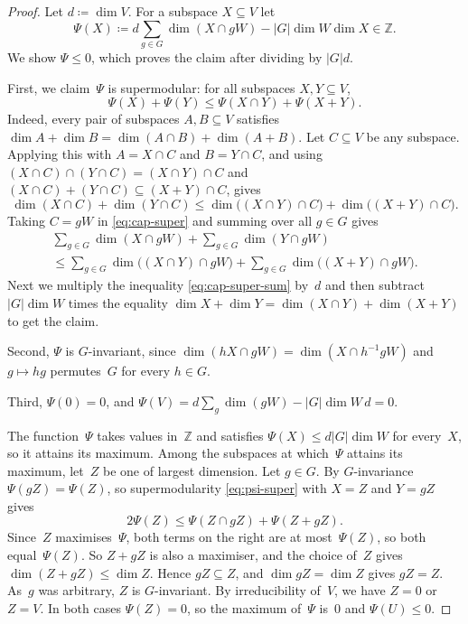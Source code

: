 \documentclass[11pt,letterpaper]{article}
\newcommand{\ZZ}{\mathbb{Z}}
\begin{document}
\begin{proof}
Let $d \coloneqq \dim V$. For a subspace $X \subseteq V$ let
\[
\Psi(X) \coloneqq d \sum_{g \in G} \dim(X \cap gW) - |G| \dim W \dim X \in \ZZ.
\]
We show $\Psi \leq 0$, which proves the claim after dividing by $|G| d$. 

First, we claim~$\Psi$ is supermodular: for all subspaces $X, Y \subseteq V$,
\begin{equation}\label{eq:psi-super}
\Psi(X) + \Psi(Y) \leq \Psi(X \cap Y) + \Psi(X + Y).
\end{equation}
Indeed, every pair of subspaces $A, B \subseteq V$ satisfies $\dim A + \dim B = \dim(A \cap B) + \dim(A+B)$. Let $C \subseteq V$ be any subspace. Applying this with $A = X \cap C$ and $B = Y \cap C$, and using $(X \cap C) \cap (Y \cap C) = (X \cap Y) \cap C$ and $(X \cap C) + (Y \cap C) \subseteq (X+Y) \cap C$, gives
\begin{equation}\label{eq:cap-super}
\dim(X \cap C) + \dim(Y \cap C) \leq \dim\bigl((X \cap Y) \cap C\bigr) + \dim\bigl((X+Y) \cap C\bigr).
\end{equation}
Taking $C = gW$ in \eqref{eq:cap-super} and summing over all $g \in G$ gives
\begin{multline}\label{eq:cap-super-sum}
\sum_{g \in G} \dim(X \cap gW) + \sum_{g \in G} \dim(Y \cap gW)\\[-0.5em]
\leq \sum_{g \in G} \dim\bigl((X \cap Y) \cap gW\bigr) + \sum_{g \in G} \dim\bigl((X+Y) \cap gW\bigr).
\end{multline}
Next we multiply the inequality \eqref{eq:cap-super-sum} by~$d$ and then subtract $|G| \dim W$ times the equality $\dim X + \dim Y = \dim(X \cap Y) + \dim(X+Y)$ to get the claim. 

Second, $\Psi$ is $G$-invariant, since $\dim(hX \cap gW) = \dim(X \cap h^{-1}gW)$ and $g \mapsto hg$ permutes~$G$ for every $h \in G$.

Third, $\Psi(0) = 0$, and $\Psi(V) = d \sum_g \dim(gW) - |G| \dim W \, d = 0$. 

The function~$\Psi$ takes values in~$\ZZ$ and satisfies $\Psi(X) \leq d |G| \dim W$ for every~$X$, so it attains its maximum. Among the subspaces at which~$\Psi$ attains its maximum, let~$Z$ be one of largest dimension. Let $g \in G$. By $G$-invariance $\Psi(gZ) = \Psi(Z)$, so supermodularity \eqref{eq:psi-super} with $X = Z$ and $Y = gZ$ gives
\[
2 \Psi(Z) \leq \Psi(Z \cap gZ) + \Psi(Z + gZ).
\]
Since~$Z$ maximises~$\Psi$, both terms on the right are at most~$\Psi(Z)$, so both equal~$\Psi(Z)$. So $Z + gZ$ is also a maximiser, and the choice of~$Z$ gives $\dim(Z + gZ) \leq \dim Z$. Hence $gZ \subseteq Z$, and $\dim gZ = \dim Z$ gives $gZ = Z$. As~$g$ was arbitrary, $Z$ is $G$-invariant. By irreducibility of~$V$, we have $Z = 0$ or $Z = V$. In both cases $\Psi(Z) = 0$, so the maximum of~$\Psi$ is~$0$ and $\Psi(U) \leq 0$.
\end{proof}
\end{document}
